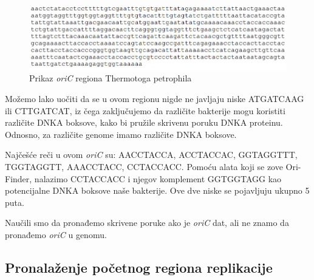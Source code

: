 \begin{figure}[h]
\centering
\includegraphics[width=1\textwidth]{poglavlja/1/slike/OriC_TP.png}
\caption{Prikaz \textit{oriC} regiona Thermotoga petrophila}
\end{figure} 

Možemo lako uočiti da se u ovom regionu nigde ne javljaju niske ATGATCAAG ili CTTGATCAT, iz čega zaključujemo da različite bakterije mogu koristiti različite DNKA boksove, kako bi pružile skrivenu poruku DNKA proteinu. Odnosno, za različite genome imamo različite DNKA boksove.

Najčešće reči u ovom \textit{oriC} su:  AACCTACCA, ACCTACCAC, GGTAGGTTT, TGGTAGGTT, AAACCTACC, CCTACCACC. Pomoću alata koji se zove Ori-Finder, nalazimo CCTACCACC i njegov komplement GGTGGTAGG kao potencijalne DNKA boksove naše bakterije. Ove dve niske se pojavljuju ukupno 5 puta.

 
Naučili smo da pronađemo skrivene poruke ako je \textit{oriC}
dat, ali ne znamo da pronađemo \textit{oriC} u genomu.

\subsection{Pronalaženje početnog regiona replikacije}

